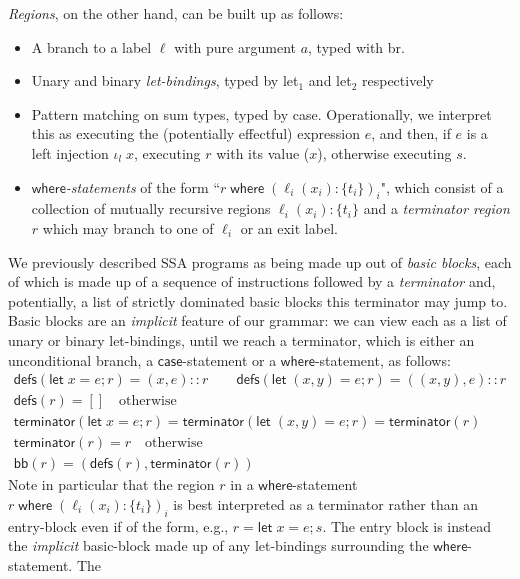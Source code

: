 \documentclass[acmsmall,screen,review]{acmart}
\newcommand{\ms}[1]{\ensuremath{\mathsf{#1}}}
\newcommand{\lto}{:}
\newcommand{\letstmt}[3]{\ensuremath{\ms{let}\;#1 = #2; #3}}
\newcommand{\where}[2]{#1\;\ms{where}\;#2}
\newcommand{\wbranch}[3]{#1(#2) \lto \{#3\}}
\newcommand{\brle}[1]{{\textsf{#1}}}
\begin{document}
\emph{Regions}, on the other hand, can be built up as follows:
\begin{itemize}
  \item A branch to a label $\ell$ with pure argument $a$, typed with \brle{br}.
  
  \item Unary and binary \emph{let-bindings}, typed by \brle{let$_1$} and \brle{let$_2$}
  respectively
  
  \item Pattern matching on sum types, typed by \brle{case}. Operationally, we interpret this as
  executing the (potentially effectful) expression $e$, and then, if $e$ is a left injection
  $\iota_l\;x$, executing $r$ with its value ($x$), otherwise executing $s$.
  
  \item \emph{\ms{where}-statements} of the form ``$\where{r}{(\wbranch{\ell_i}{x_i}{t_i})_i}$",
  which consist of a collection of mutually recursive regions $\wbranch{\ell_i}{x_i}{t_i}$ and a
  \emph{terminator region} $r$ which may branch to one of $\ell_i$ or an exit label.
\end{itemize}
We previously described SSA programs as being made up out of \emph{basic blocks}, each of which is
made up of a sequence of instructions followed by a \emph{terminator} and, potentially, a list of
strictly dominated basic blocks this terminator may jump to. Basic blocks are an \emph{implicit}
feature of our grammar: we can view each as a list of unary or binary let-bindings, until we reach a
terminator, which is either an unconditional branch, a \ms{case}-statement or a
\ms{where}-statement, as follows:
\begin{gather*}
  \ms{defs}(\letstmt{x}{e}{r}) = (x, e)::r \qquad 
  \ms{defs}(\letstmt{(x, y)}{e}{r}) = ((x, y), e)::r \\
  \ms{defs}(r) = [] \quad \text{otherwise} \\
  \ms{terminator}(\letstmt{x}{e}{r}) 
  = \ms{terminator}(\letstmt{(x, y)}{e}{r}) 
  = \ms{terminator}(r) \\
  \ms{terminator}(r) = r \quad \text{otherwise} \\
  \ms{bb}(r) = (\ms{defs}(r), \ms{terminator}(r))
\end{gather*}
Note in particular that the region $r$ in a \ms{where}-statement
$\where{r}{(\wbranch{\ell_i}{x_i}{t_i})_i}$ is best interpreted as a terminator rather than an
entry-block even if of the form, e.g., $r = \letstmt{x}{e}{s}$. The entry block is instead the
\emph{implicit} basic-block made up of any let-bindings surrounding the \ms{where}-statement. The
\end{document}
